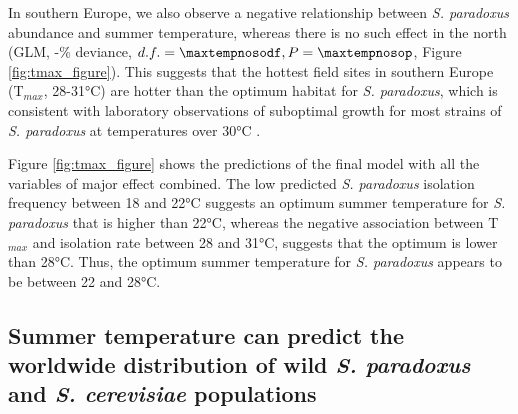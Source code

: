 \documentclass[12pt]{article}
\begin{document}
\begin{linenumbers}
In southern Europe, we also observe a negative relationship between \textit{S. paradoxus} abundance and summer temperature, whereas there is no such effect in the north (GLM, -\maxtempnosodev\% deviance, $d.f.=\maxtempnosodf,P=\maxtempnosop$, Figure \ref{fig:tmax_figure}). This suggests that the hottest field sites in southern Europe (T$_{max}$, 28-31\si{\degreeCelsius}) are hotter than the optimum habitat for \textit{S. paradoxus}, which is consistent with laboratory observations of suboptimal growth for most strains of \textit{S. paradoxus} at temperatures over 30\si{\degreeCelsius} \citep{sweeney_sympatric_2004,salvado_temperature_2011,leducq_local_2014}.

Figure \ref{fig:tmax_figure} shows the predictions of the final model with all the variables of major effect combined. The low predicted \textit{S. paradoxus} isolation frequency between 18 and 22\si{\degreeCelsius} suggests an optimum summer temperature for \textit{S. paradoxus} that is higher than 22\si{\degreeCelsius}, whereas the negative association between T$_{max}$ and isolation rate between 28 and 31\si{\degreeCelsius}, suggests that the optimum is lower than 28\si{\degreeCelsius}. Thus, the optimum summer temperature for \textit{S. paradoxus} appears to be between 22 and 28\si{\degreeCelsius}. 

\subsection*{Summer temperature can predict the worldwide distribution of wild \textit{S. paradoxus} and \textit{S. cerevisiae} populations}


\end{linenumbers}
\end{document}
